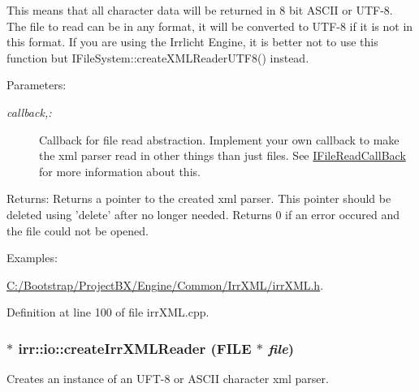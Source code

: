 This means that all character data will be returned in 8 bit ASCII or UTF-8. The file to read can be in any format, it will be converted to UTF-8 if it is not in this format. If you are using the Irrlicht Engine, it is better not to use this function but IFileSystem::createXMLReaderUTF8() instead. \begin{Desc}
\item[Parameters:]
\begin{description}
\item[{\em callback,:}]Callback for file read abstraction. Implement your own callback to make the xml parser read in other things than just files. See \hyperlink{classirr_1_1io_1_1_i_file_read_call_back}{IFileReadCallBack} for more information about this. \end{description}
\end{Desc}
\begin{Desc}
\item[Returns:]Returns a pointer to the created xml parser. This pointer should be deleted using 'delete' after no longer needed. Returns 0 if an error occured and the file could not be opened. \end{Desc}
\begin{Desc}
\item[Examples: ]\par
\hyperlink{_c_1_2_bootstrap_2_project_b_x_2_engine_2_common_2_irr_x_m_l_2irr_x_m_l_8h-example}{C:/Bootstrap/ProjectBX/Engine/Common/IrrXML/irrXML.h}.\end{Desc}


Definition at line 100 of file irrXML.cpp.\hypertarget{namespaceirr_1_1io_64543772bdd123f8be1cdb20dac36353}{
\subsubsection[{createIrrXMLReader}]{ $\ast$ irr::io::createIrrXMLReader (FILE $\ast$ {\em file})}}
\label{namespaceirr_1_1io_64543772bdd123f8be1cdb20dac36353}


Creates an instance of an UFT-8 or ASCII character xml parser. 

